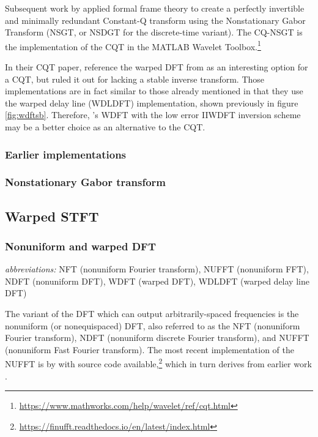 \documentclass[letter,12pt,notitlepage]{article}
\begin{document}
Subsequent work by \citet{balazs, jaillet, invertiblecqt} applied formal frame theory to create a perfectly invertible and minimally redundant Constant-Q transform using the Nonstationary Gabor Transform (NSGT, or NSDGT for the discrete-time variant). The CQ-NSGT is the implementation of the CQT in the MATLAB Wavelet Toolbox.\footnote{\href{https://www.mathworks.com/help/wavelet/ref/cqt.html}{https://www.mathworks.com/help/wavelet/ref/cqt.html}} 

In their CQT paper, \citet{klapuricqt} reference the warped DFT from \citet{warpedold1, warpedold2} as an interesting option for a CQT, but ruled it out for lacking a stable inverse transform. Those implementations are in fact similar to those already mentioned \cite{earlywarped1, earlywarped2} in that they use the warped delay line (WDLDFT) implementation, shown previously in figure \ref{fig:wdftsb}. Therefore, \citet{warped2}'s WDFT with the low error IIWDFT inversion scheme may be a better choice as an alternative to the CQT.

\subsubsection{Earlier implementations}

\subsubsection{Nonstationary Gabor transform}

\subsection{Warped STFT}

\subsubsection{Nonuniform and warped DFT}

\qquad \textit{abbreviations:} NFT (nonuniform Fourier transform), NUFFT (nonuniform FFT), NDFT (nonuniform DFT), WDFT (warped DFT), WDLDFT (warped delay line DFT)

The variant of the DFT which can output arbitrarily-spaced frequencies is the nonuniform (or nonequispaced) DFT, also referred to as the NFT (nonuniform Fourier transform), NDFT (nonuniform discrete Fourier transform), and NUFFT (nonuniform Fast Fourier transform). The most recent implementation of the NUFFT is by \citet{nufft1} with source code available,\footnote{\href{https://finufft.readthedocs.io/en/latest/index.html}{https://finufft.readthedocs.io/en/latest/index.html}} which in turn derives from earlier work \cite{nufft2, nufft3}.
\end{document}
